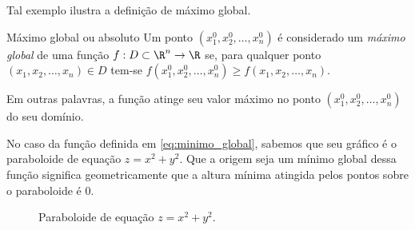 Tal exemplo ilustra a definição de máximo global.
\begin{definition}{Máximo global ou absoluto}{}
Um ponto \((x_1^0, x_2^0, \ldots, x_n^0)\) é considerado um \textit{máximo global} de uma função \(f:D\subset \R^n\to \R\) se, para qualquer ponto \((x_1, x_2, \ldots, x_n)\in D\) tem-se \(f(x_1^0, x_2^0, \ldots, x_n^0) \geq f(x_1, x_2, \ldots, x_n)\).
\end{definition}

Em outras palavras, a função atinge seu valor máximo no ponto \((x_1^0, x_2^0, \ldots, x_n^0)\) do seu domínio. 


No caso da função definida em \eqref{eq:minimo_global}, sabemos que seu gráfico é o paraboloide de equação $z=x^2+y^2$. Que a origem seja um mínimo global dessa função significa geometricamente que a altura mínima atingida pelos pontos sobre o paraboloide é 0. 
\begin{figure}[!htb]
    \centering
{} %
        \caption{Paraboloide de equação $z=x^2+y^2$.}
    \label{fig:enter-label}
\end{figure}






